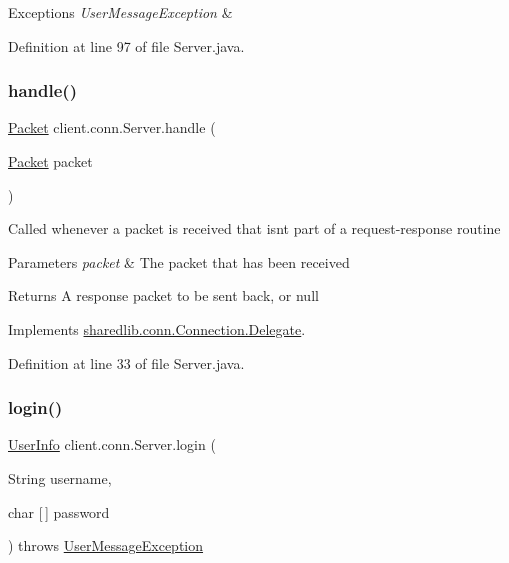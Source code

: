 \begin{DoxyExceptions}{Exceptions}
{\em User\+Message\+Exception} & \\
\hline
\end{DoxyExceptions}


Definition at line 97 of file Server.\+java.

\hypertarget{classclient_1_1conn_1_1_server_a620def50e5115d3798407dfff5433ead}{}\label{classclient_1_1conn_1_1_server_a620def50e5115d3798407dfff5433ead} 
\subsubsection{\texorpdfstring{handle()}{handle()}}
{\footnotesize\ttfamily \hyperlink{classsharedlib_1_1conn_1_1_packet}{Packet} client.\+conn.\+Server.\+handle (\begin{DoxyParamCaption}\item[{\hyperlink{classsharedlib_1_1conn_1_1_packet}{Packet}}]{packet }\end{DoxyParamCaption})}

Called whenever a packet is received that isn\textquotesingle{}t part of a request-\/response routine


\begin{DoxyParams}{Parameters}
{\em packet} & The packet that has been received \\
\hline
\end{DoxyParams}
\begin{DoxyReturn}{Returns}
A response packet to be sent back, or null 
\end{DoxyReturn}


Implements \hyperlink{interfacesharedlib_1_1conn_1_1_connection_1_1_delegate_abb4308f0b1aa890e0c19635f1eb9cd09}{sharedlib.\+conn.\+Connection.\+Delegate}.



Definition at line 33 of file Server.\+java.

\hypertarget{classclient_1_1conn_1_1_server_a064556a987ee40eb0a91a952ae08969f}{}\label{classclient_1_1conn_1_1_server_a064556a987ee40eb0a91a952ae08969f} 
\subsubsection{\texorpdfstring{login()}{login()}}
{\footnotesize\ttfamily \hyperlink{classsharedlib_1_1tuples_1_1_user_info}{User\+Info} client.\+conn.\+Server.\+login (\begin{DoxyParamCaption}\item[{String}]{username,  }\item[{char \mbox{[}$\,$\mbox{]}}]{password }\end{DoxyParamCaption}) throws \hyperlink{classsharedlib_1_1exceptions_1_1_user_message_exception}{User\+Message\+Exception}}

